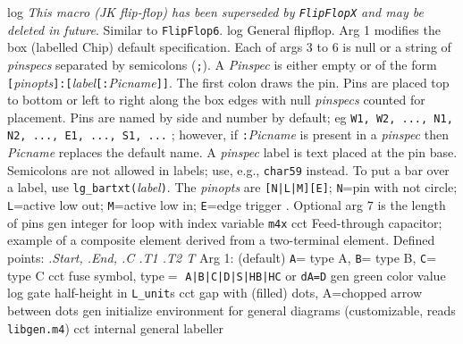   {log}
  {{\em This macro (JK flip-flop)
    has been superseded by {\tt FlipFlopX} and may be deleted
    in future}.
   Similar to {\tt FlipFlop6}.}
  {log}
  {General flipflop.
   Arg 1 modifies the box (labelled Chip) default specification.
   Each of args 3 to 6 is null or a string of {\sl pinspecs}
   separated by semicolons ({\tt;}).  A {\sl Pinspec} is either empty
   or of the form
   {\tt[}{\sl pinopts}{\tt]:[}{\sl label}{\tt[:}{\sl Picname}{\tt]]}.
   The first colon draws the pin.
   Pins are placed top to bottom or left to right along the box edges with
   null {\sl pinspecs} counted for placement. Pins are named by side and number
   by default; eg {\tt W1, W2, ..., N1, N2, ..., E1, ..., S1, ...} ; however,
   if {\tt:}{\sl Picname} is present in a {\sl pinspec} then {\sl Picname}
   replaces the default name.
   A {\sl pinspec} label is text placed at the pin base. Semicolons are
   not allowed in labels; use, e.g., {\tt {}char59}
   instead.
   To put a bar over a label, use {\tt lg\_bartxt(}{\sl label}{\tt)}.
   The {\sl pinopts} are {\tt[N|L|M][E]};
 {\tt N}=pin with not circle;
 {\tt L}=active low out; {\tt M}=active low in;
 {\tt E}=edge trigger . Optional arg 7 is the length
 of pins}
  {gen}
  {integer for loop with index variable {\tt m4x} }
  {cct}
  {Feed-through capacitor; example of a composite element derived from
   a two-terminal element.  Defined points: {\sl .Start, .End, .C .T1 .T2 T}
   Arg 1: (default) {\tt A}= type A, {\tt B}= type B, {\tt C}= type C 
   }
  {cct}
  {fuse symbol, type$=$
  {\tt  A|B|C|D|S|HB|HC} or {\tt dA=D}}
  {gen}
  {green color value}
  {log}
  {gate half-height in {\tt L\_unit}s}
  {cct}
  {gap with (filled) dots, A=chopped arrow between dots}
  {gen}
  {initialize environment for general diagrams
    (customizable, reads {\tt libgen.m4})}
  {cct}
  {internal general labeller}
